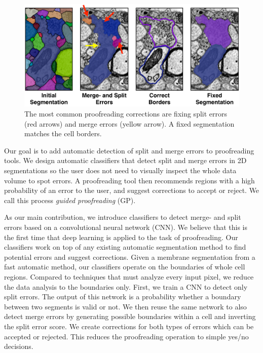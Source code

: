 \begin{figure}[t]
\begin{center}
  \includegraphics[width=\linewidth]{gfx/merge_and_split_errors.png}
\end{center}
\vspace{-4mm}
   \caption{The most common proofreading corrections are fixing split errors (red arrows) and merge errors (yellow arrow). A fixed segmentation matches the cell borders.}
\label{fig:merge_and_slit_errors}
\end{figure}

Our goal is to add automatic detection of split and merge errors to proofreading tools. We design automatic classifiers that detect split and merge errors in 2D segmentations so the user does not need to visually inspect the whole data volume to spot errors. A proofreading tool then recommends regions with a high probability of an error to the user, and suggest corrections to accept or reject. We call this process \textit{guided proofreading} (GP).

As our main contribution, we introduce classifiers to detect merge- and split errors based on a convolutional neural network (CNN). We believe that this is the first time that deep learning is applied to the task of proofreading. Our classifiers work on top of any existing automatic segmentation method to find potential errors and suggest corrections. Given a membrane segmentation from a fast automatic method, our classifiers operate on the boundaries of whole cell regions. Compared to techniques that must analyze every input pixel, we reduce the data analysis to the boundaries only. First, we train a CNN to detect only split errors. The output of this network is a probability whether a boundary between two segments is valid or not. We then reuse the same network to also detect merge errors by generating possible boundaries within a cell and inverting the split error score. We create corrections for both types of errors which can be accepted or rejected. This reduces the proofreading operation to simple yes/no decisions.

